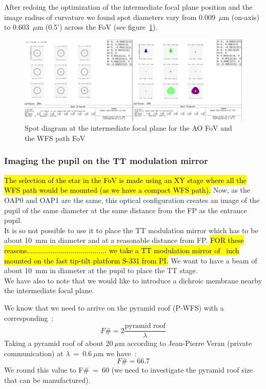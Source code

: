 \documentclass[12pt,a4paper]{article}
\begin{document}
After redoing the optimization of the intermediate focal plane position and the image radius of curvature we found spot diameters vary from 0.009~$\mu$m (on-axis) to 0.603~$\mu$m (0.5') across the FoV (see figure~\ref{fig:IntermediateFP_SpotDiagram}).\\
\begin{figure}[H]
	\begin{center}
		\includegraphics[width=.8\textwidth]{images/IntermediateFP_SpotDiagram.PNG}
		\caption{Spot diagram at the intermediate focal plane for the AO FoV and the WFS path FoV}\label{fig:IntermediateFP_SpotDiagram}
	\end{center}
\end{figure}

\subsubsection{Imaging the pupil on the TT modulation mirror}
\hl{The selection of the star in the FoV is made using an XY stage where all the WFS path would be mounted (as we have a compact WFS path).}
Now, as the OAP0 and OAP1 are the same, this optical configuration creates an image of the pupil of the same diameter at the same distance from the FP as the entrance pupil.\\ 
It is so not possible to use it to place the TT modulation mirror which has to be about 10~mm in diameter and at a reasonable distance from FP.
\hl{FOR these reasons........................................ we take a TT modulation mirror of ~inch mounted on the fast tip-tilt platform S-331 from PI.}
We want to have a beam of about 10~mm in diameter at the pupil to place the TT stage.\\

We have also to note that we would like to introduce a dichroic membrane nearby the intermediate focal plane.

We know that we need to arrive on the pyramid roof (P-WFS) with a corresponding~:
\begin{equation}
	 F\#=2\frac{\text{pyramid roof}}{\lambda}\label{eq:FnumEq}
\end{equation}
Taking a pyramid roof of about $20~\mu$m according to Jean-Pierre Veran (private communication) at $\lambda~=~0.6~\mu$m we have~:
\begin{equation}
	F\# = 66.7\label{eq:Fnum}
\end{equation}
We round this value to F\#~=~60 (we need to investigate the pyramid roof size that can be manufactured).\\
\end{document}
